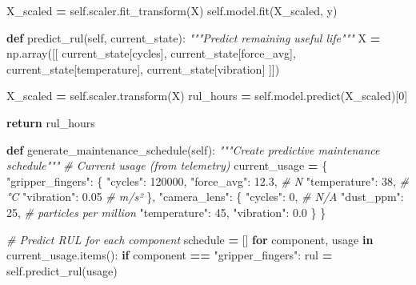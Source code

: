 \documentclass[
]{article}
\newenvironment{Shaded}{\begin{snugshade}}{\end{snugshade}}
\newcommand{\CommentTok}[1]{\textcolor[rgb]{0.56,0.35,0.01}{\textit{#1}}}
\newcommand{\ControlFlowTok}[1]{\textcolor[rgb]{0.13,0.29,0.53}{\textbf{#1}}}
\newcommand{\DecValTok}[1]{\textcolor[rgb]{0.00,0.00,0.81}{#1}}
\newcommand{\FloatTok}[1]{\textcolor[rgb]{0.00,0.00,0.81}{#1}}
\newcommand{\KeywordTok}[1]{\textcolor[rgb]{0.13,0.29,0.53}{\textbf{#1}}}
\newcommand{\NormalTok}[1]{#1}
\newcommand{\OperatorTok}[1]{\textcolor[rgb]{0.81,0.36,0.00}{\textbf{#1}}}
\newcommand{\StringTok}[1]{\textcolor[rgb]{0.31,0.60,0.02}{#1}}
\newcommand{\VariableTok}[1]{\textcolor[rgb]{0.00,0.00,0.00}{#1}}
\begin{document}
\begin{Shaded}
\begin{Highlighting}[]
\NormalTok{        X\_scaled }\OperatorTok{=} \VariableTok{self}\NormalTok{.scaler.fit\_transform(X)}
        \VariableTok{self}\NormalTok{.model.fit(X\_scaled, y)}

    \KeywordTok{def}\NormalTok{ predict\_rul(}\VariableTok{self}\NormalTok{, current\_state):}
        \CommentTok{"""Predict remaining useful life"""}
\NormalTok{        X }\OperatorTok{=}\NormalTok{ np.array([[}
\NormalTok{            current\_state[}\StringTok{\textquotesingle{}cycles\textquotesingle{}}\NormalTok{],}
\NormalTok{            current\_state[}\StringTok{\textquotesingle{}force\_avg\textquotesingle{}}\NormalTok{],}
\NormalTok{            current\_state[}\StringTok{\textquotesingle{}temperature\textquotesingle{}}\NormalTok{],}
\NormalTok{            current\_state[}\StringTok{\textquotesingle{}vibration\textquotesingle{}}\NormalTok{]}
\NormalTok{        ]])}

\NormalTok{        X\_scaled }\OperatorTok{=} \VariableTok{self}\NormalTok{.scaler.transform(X)}
\NormalTok{        rul\_hours }\OperatorTok{=} \VariableTok{self}\NormalTok{.model.predict(X\_scaled)[}\DecValTok{0}\NormalTok{]}

        \ControlFlowTok{return}\NormalTok{ rul\_hours}

    \KeywordTok{def}\NormalTok{ generate\_maintenance\_schedule(}\VariableTok{self}\NormalTok{):}
        \CommentTok{"""Create predictive maintenance schedule"""}
        \CommentTok{\# Current usage (from telemetry)}
\NormalTok{        current\_usage }\OperatorTok{=}\NormalTok{ \{}
            \StringTok{"gripper\_fingers"}\NormalTok{: \{}
                \StringTok{"cycles"}\NormalTok{: }\DecValTok{120000}\NormalTok{,}
                \StringTok{"force\_avg"}\NormalTok{: }\FloatTok{12.3}\NormalTok{,  }\CommentTok{\# N}
                \StringTok{"temperature"}\NormalTok{: }\DecValTok{38}\NormalTok{,  }\CommentTok{\# °C}
                \StringTok{"vibration"}\NormalTok{: }\FloatTok{0.05}  \CommentTok{\# m/s²}
\NormalTok{            \},}
            \StringTok{"camera\_lens"}\NormalTok{: \{}
                \StringTok{"cycles"}\NormalTok{: }\DecValTok{0}\NormalTok{,  }\CommentTok{\# N/A}
                \StringTok{"dust\_ppm"}\NormalTok{: }\DecValTok{25}\NormalTok{,  }\CommentTok{\# particles per million}
                \StringTok{"temperature"}\NormalTok{: }\DecValTok{45}\NormalTok{,}
                \StringTok{"vibration"}\NormalTok{: }\FloatTok{0.0}
\NormalTok{            \}}
\NormalTok{        \}}

        \CommentTok{\# Predict RUL for each component}
\NormalTok{        schedule }\OperatorTok{=}\NormalTok{ []}
        \ControlFlowTok{for}\NormalTok{ component, usage }\KeywordTok{in}\NormalTok{ current\_usage.items():}
            \ControlFlowTok{if}\NormalTok{ component }\OperatorTok{==} \StringTok{"gripper\_fingers"}\NormalTok{:}
\NormalTok{                rul }\OperatorTok{=} \VariableTok{self}\NormalTok{.predict\_rul(usage)}


\end{Highlighting}
\end{Shaded}
\end{document}
